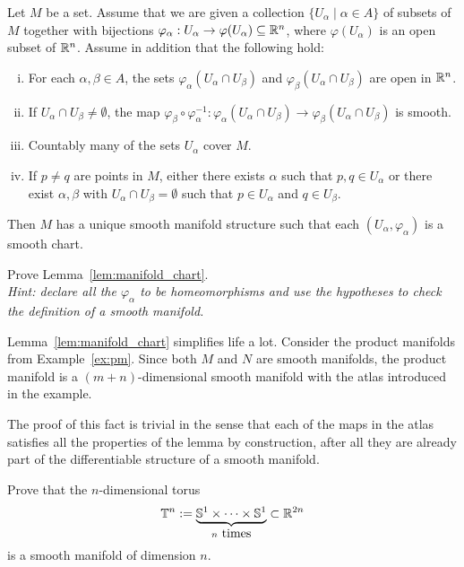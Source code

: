 \begin{lemma}\label{lem:manifold_chart}
  Let $M$ be a set. Assume that we are given a collection $\{U_\alpha\mid \alpha\in A\}$ of subsets of $M$ together with bijections $\varphi_\alpha: U_\alpha\to\varphi(U_\alpha)\subseteq\mathbb{R}^n$, where $\varphi(U_\alpha)$ is an open subset of $\mathbb{R}^n$. Assume in addition that the following hold:
  \begin{enumerate}[(i)]
    \item For each $\alpha, \beta \in A$, the sets $\varphi_\alpha(U_\alpha \cap U_\beta)$ and $\varphi_\beta(U_\alpha \cap U_\beta)$ are open in $\mathbb{R}^n$.
    \item If $U_\alpha \cap U_\beta \neq \emptyset$, the map $\varphi_\beta\circ\varphi_\alpha^{-1}: \varphi_\alpha(U_\alpha \cap U_\beta)\to \varphi_\beta(U_\alpha \cap U_\beta)$ is smooth.
    \item Countably many of the sets $U_\alpha$ cover $M$.
    \item If $p\neq q$ are points in $M$, either there exists $\alpha$ such that $p,q\in U_\alpha$ or there exist $\alpha,\beta$ with $U_\alpha\cap U_\beta=\emptyset$ such that $p\in U_\alpha$ and $q\in U_\beta$.
  \end{enumerate}
  Then $M$ has a unique smooth manifold structure such that each $(U_\alpha,\varphi_\alpha)$ is a smooth chart.
\end{lemma}
\begin{exercise}
  Prove Lemma~\ref{lem:manifold_chart}.\\
  \textit{\small Hint: declare all the $\varphi_\alpha$ to be homeomorphisms and use the hypotheses to check the definition of a smooth manifold.}
\end{exercise}

\begin{example}
  Lemma~\ref{lem:manifold_chart} simplifies life a lot.
  Consider the product manifolds from Example~\ref{ex:pm}.
  Since both $M$ and $N$ are smooth manifolds, the product manifold is a $(m+n)$-dimensional smooth manifold with the atlas introduced in the example.

  The proof of this fact is trivial in the sense that each of the maps in the atlas satisfies all the properties of the lemma by construction, after all they are already part of the differentiable structure of a smooth manifold.
\end{example}

\begin{exercise}
  Prove that the $n$-dimensional torus
  \begin{equation}
    \bT^n := \LaTeXunderbrace{\bS^1\times\cdots\times\bS^1}_{n\mbox{ times}} \subset \R^{2n}
  \end{equation}
  is a smooth manifold of dimension $n$.
\end{exercise}

